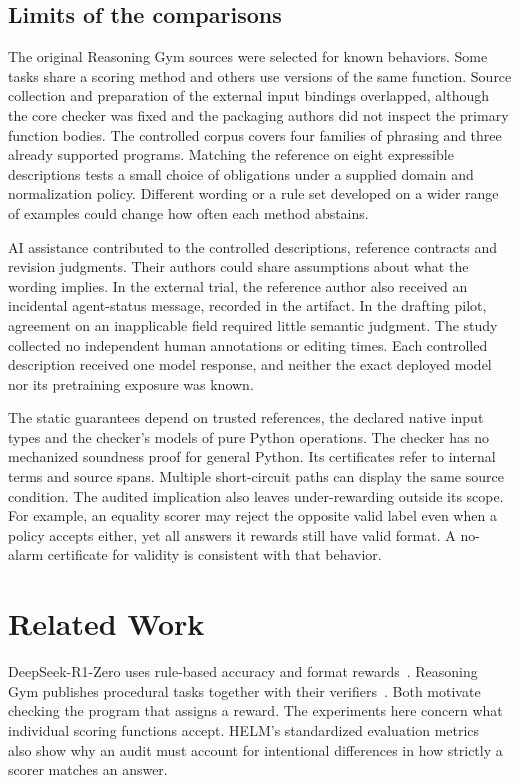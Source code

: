 \documentclass[sigconf]{acmart}
\begin{document}
\subsection{Limits of the comparisons}

The original Reasoning Gym sources were selected for known behaviors. Some tasks share a scoring method and others use versions of the same function. Source collection and preparation of the external input bindings overlapped, although the core checker was fixed and the packaging authors did not inspect the primary function bodies. The controlled corpus covers four families of phrasing and three already supported programs. Matching the reference on eight expressible descriptions tests a small choice of obligations under a supplied domain and normalization policy. Different wording or a rule set developed on a wider range of examples could change how often each method abstains.

AI assistance contributed to the controlled descriptions, reference contracts and revision judgments. Their authors could share assumptions about what the wording implies. In the external trial, the reference author also received an incidental agent-status message, recorded in the artifact. In the drafting pilot, agreement on an inapplicable field required little semantic judgment. The study collected no independent human annotations or editing times. Each controlled description received one model response, and neither the exact deployed model nor its pretraining exposure was known.

The static guarantees depend on trusted references, the declared native input types and the checker's models of pure Python operations. The checker has no mechanized soundness proof for general Python. Its certificates refer to internal terms and source spans. Multiple short-circuit paths can display the same source condition. The audited implication also leaves under-rewarding outside its scope. For example, an equality scorer may reject the opposite valid label even when a policy accepts either, yet all answers it rewards still have valid format. A no-alarm certificate for validity is consistent with that behavior.

\section{Related Work}

DeepSeek-R1-Zero uses rule-based accuracy and format rewards~\cite{deepseekr1}. Reasoning Gym publishes procedural tasks together with their verifiers~\cite{reasoninggym}. Both motivate checking the program that assigns a reward. The experiments here concern what individual scoring functions accept. HELM's standardized evaluation metrics~\cite{helm} also show why an audit must account for intentional differences in how strictly a scorer matches an answer.
\end{document}
